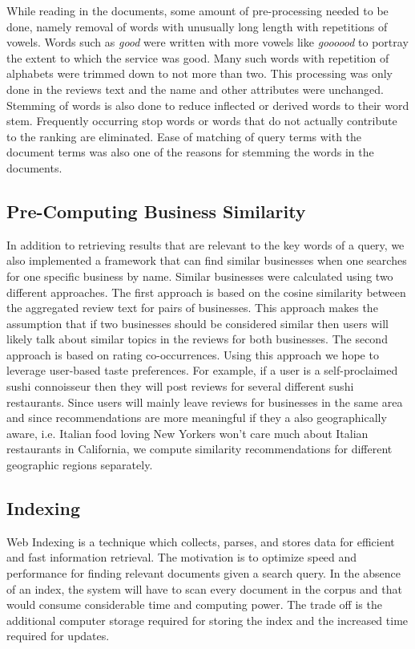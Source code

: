 \documentclass[paper=letter, fontsize=15pt]{article} %
\begin{document}
While reading in the documents, some amount of pre-processing needed to be done, namely removal of words with unusually long length with repetitions of vowels. Words such as \textit{good} were written with more vowels like \textit{goooood} to portray the extent to which the service was good. Many such words with repetition of alphabets were trimmed down to not more than two. This processing was only done in the reviews text and the name and other attributes were unchanged. Stemming\cite{sstem} of words is also done to  reduce inflected or derived words to their word stem. Frequently occurring stop words or words that do not actually contribute to the ranking are eliminated. Ease of matching of query terms with the document terms was also one of the reasons for stemming the words in the documents.

\subsection{Pre-Computing Business Similarity}
In addition to retrieving results that are relevant to the key words of a query, we also implemented a framework that can find similar businesses when one searches for one specific business by name. Similar businesses were calculated using two different approaches. The first approach is based on the cosine similarity between the aggregated review text for pairs of businesses. This approach makes the assumption that if two businesses should be considered similar then users will likely talk about similar topics in the reviews for both businesses. The second approach is based on rating co-occurrences. Using this approach we hope to leverage user-based taste preferences. For example, if a user is a self-proclaimed sushi connoisseur then they will post reviews for several different sushi restaurants. Since users will mainly leave reviews for businesses in the same area and since recommendations are more meaningful if they a also geographically aware, i.e. Italian food loving New Yorkers won't care much about Italian restaurants in California, we compute similarity recommendations for different geographic regions separately.

\subsection{Indexing}
Web Indexing\cite{sindex} is a technique which collects, parses, and stores data for efficient and fast information retrieval. The motivation  is to optimize speed and performance for finding relevant documents given a search query. In the absence of an index, the system will have to scan every document in the corpus and that would consume considerable time and computing power. The trade off  is the additional computer storage required for storing the index and the increased time required for updates. 
\end{document}
